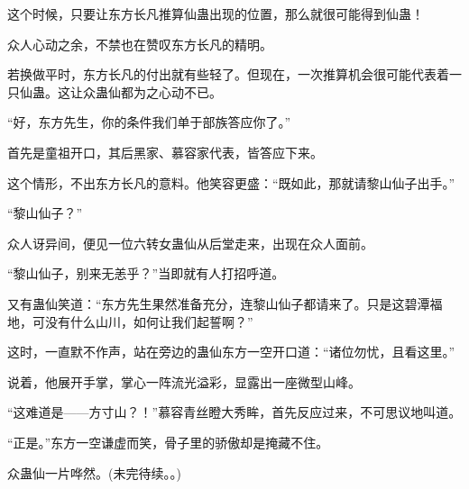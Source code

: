 \begin{this_body}
这个时候，只要让东方长凡推算仙蛊出现的位置，那么就很可能得到仙蛊！

众人心动之余，不禁也在赞叹东方长凡的精明。

若换做平时，东方长凡的付出就有些轻了。但现在，一次推算机会很可能代表着一只仙蛊。这让众蛊仙都为之心动不已。

“好，东方先生，你的条件我们单于部族答应你了。”

首先是童祖开口，其后黑家、慕容家代表，皆答应下来。

这个情形，不出东方长凡的意料。他笑容更盛：“既如此，那就请黎山仙子出手。”

“黎山仙子？”

众人讶异间，便见一位六转女蛊仙从后堂走来，出现在众人面前。

“黎山仙子，别来无恙乎？”当即就有人打招呼道。

又有蛊仙笑道：“东方先生果然准备充分，连黎山仙子都请来了。只是这碧潭福地，可没有什么山川，如何让我们起誓啊？”

这时，一直默不作声，站在旁边的蛊仙东方一空开口道：“诸位勿忧，且看这里。”

说着，他展开手掌，掌心一阵流光溢彩，显露出一座微型山峰。

“这难道是——方寸山？！”慕容青丝瞪大秀眸，首先反应过来，不可思议地叫道。

“正是。”东方一空谦虚而笑，骨子里的骄傲却是掩藏不住。

众蛊仙一片哗然。(未完待续。。)

\end{this_body}

